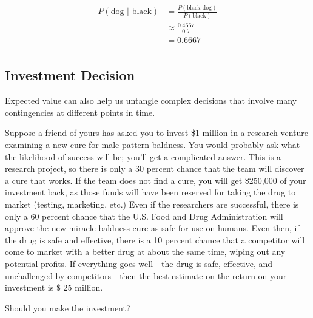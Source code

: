 \documentclass[letterpaper, landscape]{exam}
\begin{document}
  \begin{align*}
    P(\text{dog } | \text{ black}) & = \frac{P(\text{black dog})}{P(\text{black})} \\
                                   & \approx \frac{0.4667}{0.7} \\
                                   & = 0.6667 \\
  \end{align*}


  \subsection{Investment Decision}
  Expected value can also help us untangle complex decisions that involve many
  contingencies at different points in time. 

  Suppose a friend of yours has asked you to invest \$1 million in a research
  venture examining a new cure for male pattern baldness. You would probably ask
  what the likelihood of success will be; you’ll get a complicated answer. This
  is a research project, so there is only a 30 percent chance that the team will
  discover a cure that works. If the team does not find a cure, you will get
  \$250,000 of your investment back, as those funds will have been reserved for
  taking the drug to market (testing, marketing, etc.) Even if the researchers
  are successful, there is only a 60 percent chance that the U.S. Food and Drug
  Administration will approve the new miracle baldness cure as safe for use on
  humans. Even then, if the drug is safe and effective, there is a 10 percent
  chance that a competitor will come to market with a better drug at about the
  same time, wiping out any potential profits. If everything goes well---the drug
  is safe, effective, and unchallenged by competitors---then the best estimate
  on the return on your investment is \$ 25 million. 

  Should you make the investment? 

\end{document}
